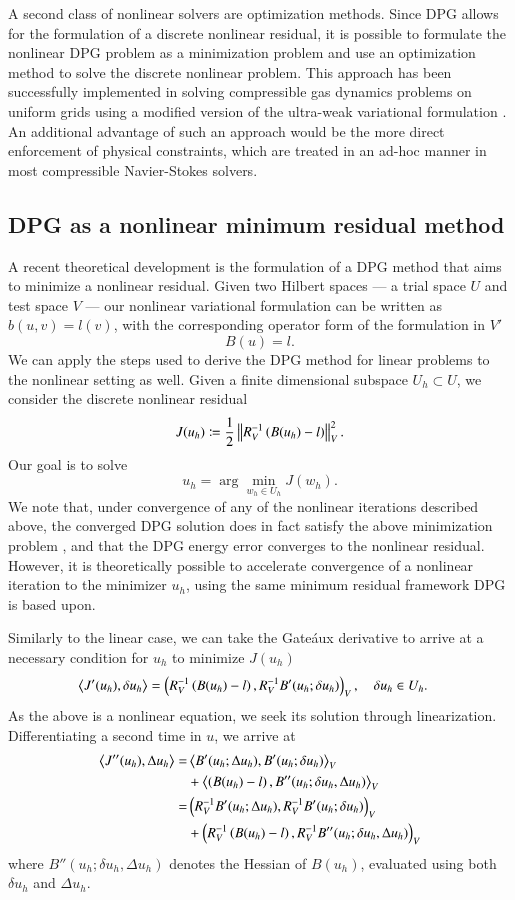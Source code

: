 A second class of nonlinear solvers are optimization methods.  Since DPG allows for the formulation of a discrete nonlinear residual, it is possible to formulate the nonlinear DPG problem as a minimization problem and use an optimization method to solve the discrete nonlinear problem.  This approach has been successfully implemented in solving compressible gas dynamics problems on uniform grids using a modified version of the ultra-weak variational formulation \cite{MITDPG, optDPG}.  An additional advantage of such an approach would be the more direct enforcement of physical constraints, which are treated in an ad-hoc manner in most compressible Navier-Stokes solvers.  

\subsection{DPG as a nonlinear minimum residual method}

A recent theoretical development is the formulation of a DPG method that aims to minimize a nonlinear residual. Given two Hilbert spaces --- a trial space $U$ and test space $V$ --- our nonlinear variational formulation can be written as $b(u,v) = l(v)$, with the corresponding operator form of the formulation in $V'$
\[
B(u) = l.
\]
We can apply the steps used to derive the DPG method for linear problems to the nonlinear setting as well. Given a finite dimensional subspace $U_h \subset U$, we consider the discrete nonlinear residual
\[
J(u_h) \coloneqq \frac{1}{2}\nor{R_V^{-1}\left(B(u_h)-l\right)}_V^2.
\]
Our goal is to solve
\[
u_h = \arg \min_{w_h\in U_h}J(w_h).
\]
We note that, under convergence of any of the nonlinear iterations described above, the converged DPG solution does in fact satisfy the above minimization problem \cite{MITDPG}, and that the DPG energy error converges to the nonlinear residual.  However, it is theoretically possible to accelerate convergence of a nonlinear iteration to the minimizer $u_h$, using the same minimum residual framework DPG is based upon.  

Similarly to the linear case, we can take the Gate\'aux derivative to arrive at a necessary condition for $u_h$ to minimize $J(u_h)$ 
\begin{align*}
\LRa{J'(u_h), \delta u_h} &= \LRp{R_V^{-1}\left(B(u_h)-l\right),R_V^{-1}B'(u_h;\delta u_h)}_V, \quad \delta u_h \in U_h. 
\end{align*}
As the above is a nonlinear equation, we seek its solution through linearization. Differentiating a second time in $u$, we arrive at
\begin{align*}
\LRa{J''(u_h), \Delta u_h} =& \LRa{B'(u_h;\Delta u_h), B'(u_h;\delta u_h)}_V \\
& + \LRa{\left(B(u_h)-l\right),B''(u_h;\delta u_h,\Delta u_h)}_V \\
=& \LRp{R_V^{-1}B'(u_h;\Delta u_h), R_V^{-1}B'(u_h;\delta u_h)}_V \\
& + \LRp{R_V^{-1}\left(B(u_h)-l\right),R_V^{-1}B''(u_h;\delta u_h,\Delta u_h)}_V 
\end{align*}
where $B''(u_h;\delta u_h,\Delta u_h)$ denotes the Hessian of $B(u_h)$, evaluated using both $\delta u_h$ and $\Delta u_h$. 

